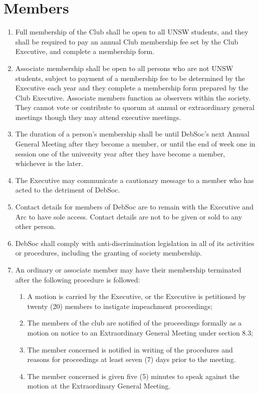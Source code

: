 \newpage
\section{Members}

\begin{enumerate}
\item Full membership of the Club shall be open to all UNSW students, and they shall be required to pay an annual Club membership fee set by the Club Executive, and complete a membership form.
\item Associate membership shall be open to all persons who are not UNSW students, subject to payment of a membership fee to be determined by the Executive each year and they complete a membership form prepared by the Club Executive. Associate members function as observers within the society. They cannot vote or contribute to quorum at annual or extraordinary general meetings though they may attend executive meetings.
\item The duration of a person’s membership shall be until DebSoc’s next Annual General Meeting after they become a member, or until the end of week one in session one of the university year after they have become a member, whichever is the later.
\item The Executive may communicate a cautionary message to a member who has acted to the detriment of DebSoc.
\item Contact details for members of DebSoc are to remain with the Executive and Arc to have sole access. Contact details are not to be given or sold to any other person.
\item DebSoc shall comply with anti-discrimination legislation in all of its activities or procedures, including the granting of society membership.
\item An ordinary or associate member may have their membership terminated after the following procedure is followed:
  \begin{enumerate}
  \item A motion is carried by the Executive, or the Executive is petitioned by twenty (20) members to instigate impeachment proceedings;
  \item The members of the club are notified of the proceedings formally as a motion on notice to an Extraordinary General Meeting under section 8.3;
  \item The member concerned is notified in writing of the procedures and reasons for proceedings at least seven (7) days prior to the meeting.
  \item The member concerned is given five (5) minutes to speak against the motion at the Extraordinary General Meeting.

\end{enumerate}
\end{enumerate}
